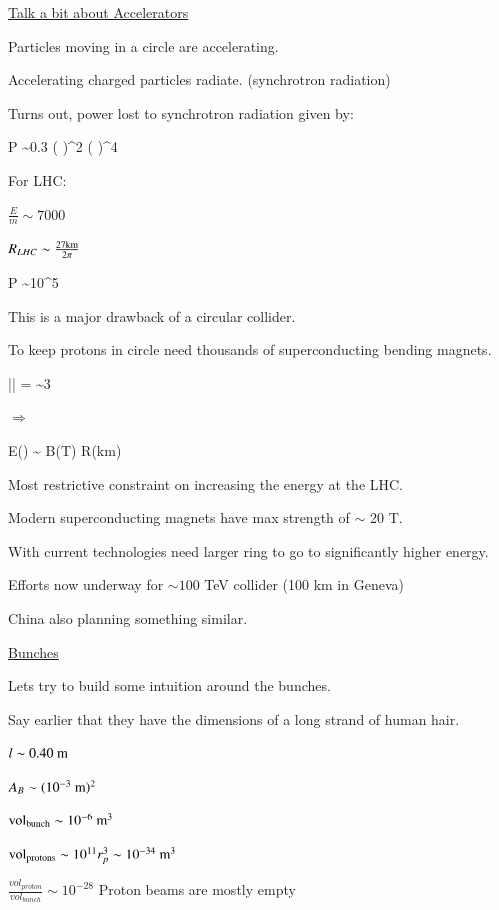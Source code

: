 {\clearpage

\underline{Talk a bit about Accelerators}

Particles moving in a circle are accelerating.

Accelerating charged particles radiate. (synchrotron radiation)

Turns out, power lost to synchrotron radiation given by: 

\be
P \sim 0.3 \left( \right)^2  \left( \right)^4   
\ee

For LHC:
\bi
\item[-] $\frac{E}{m} \sim 7000$
\item[-] $R_{LHC} \sim \frac{27 \textrm{km}}{2\pi}$
\ei

\be
P \sim 10^{5} 
\ee

This is a major drawback of a circular collider. 

To keep  protons in circle need thousands of superconducting  bending magnets. 


\be
|| =  \sim 3  
\ee


$\Rightarrow$

\be
E() \sim {} B(T) R(km)
\ee

Most restrictive constraint on increasing the energy at the LHC.

Modern superconducting magnets have max strength of $\sim$ 20 T. 

With current technologies need larger ring to go to significantly higher energy. 

Efforts now underway for $\sim 100$ TeV collider (100 km in Geneva)

China also planning something similar.

\lineacross

\clearpage

\underline{Bunches}

Lets try to build some intuition around the bunches.  

Say earlier that they have the dimensions of a long strand of human hair.

\bi
\item[-] $l \sim 0.40\ \textrm{m}$
\item[-] $A_B \sim (10^{-3}\ \textrm{m})^2$
\item[-] $\rmt{vol}_{\rmt{bunch}} \sim 10^{-6}\ \m^3$
\item[-] $\textrm{vol}_{\textrm{protons}} \sim 10^{11} r_p^3 \sim 10^{-34}\ \textrm{m}^3$
\item[-] $\frac{vol_{proton}}{vol_{bunch}} \sim 10^{-28} $
\ei
Proton beams are mostly empty

}
